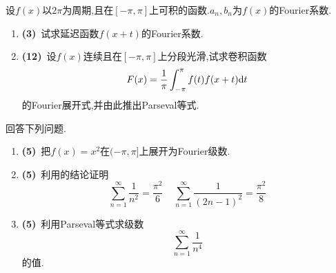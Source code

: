 \documentclass{ctexart}
\begin{document}
\begin{problem}[8.(15\songti{分})]
    设$f(x)$以$2\pi$为周期,且在$[-\pi,\pi]$上可积的函数.$a_n,b_n$为$f(x)$的Fourier系数.
    \begin{enumerate}[label=\tbf{(\arabic*)},topsep=0pt,parsep=0pt,itemsep=0pt,partopsep=0pt]
        \item \textbf{(3)}\ 试求延迟函数$f(x+t)$的Fourier系数.
        \item \textbf{(12)}\ 设$f(x)$连续且在$[-\pi,\pi]$上分段光滑,试求卷积函数
            \[F(x)=\dfrac{1}{\pi}\int_{-\pi}^{\pi}f(t)f(x+t)\mathrm{d} t\]
            的Fourier展开式,并由此推出Parseval等式.

    \end{enumerate}
\end{problem}
\begin{problem}[9.(15\songti{分})]
    回答下列问题.
    \begin{enumerate}[label=\tbf{(\arabic*)},topsep=0pt,parsep=0pt,itemsep=0pt,partopsep=0pt]
        \item \textbf{(5)}\ 把$f(x)=x^2$在$(-\pi,\pi]$上展开为Fourier级数.
        \item \textbf{(5)}\ 利用的结论证明
            \[\sum_{n=1}^{\infty}\dfrac{1}{n^2}=\dfrac{\pi^2}{6}\ \ \ \ \ \sum_{n=1}^{\infty}\dfrac{1}{(2n-1)^2}=\dfrac{\pi^2}{8}\]
        \item \textbf{(5)}\ 利用Parseval等式求级数
            \[\sum_{n=1}^{\infty}\dfrac{1}{n^4}\]
            的值.
    \end{enumerate}
\end{problem}
\end{document}
